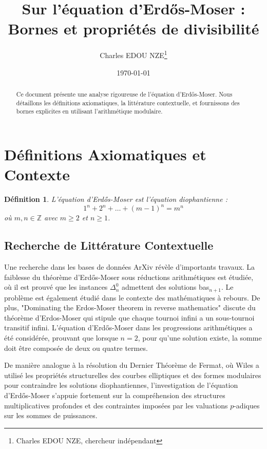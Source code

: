 \documentclass[12pt, a4paper]{article}
\title{Sur l'\'equation d'Erd\H{o}s-Moser : Bornes et propri\'et\'es de divisibilit\'e}
\author{Charles EDOU NZE\thanks{Charles EDOU NZE, chercheur ind\'ependant}}
\date{\today}
\newtheorem{definition}[theorem]{D\'efinition}
\begin{document}
\maketitle

\begin{abstract}
Ce document pr\'esente une analyse rigoureuse de l'\'equation d'Erd\H{o}s-Moser. Nous d\'etaillons les d\'efinitions axiomatiques, la litt\'erature contextuelle, et fournissons des bornes explicites en utilisant l'arithm\'etique modulaire.
\end{abstract}

\tableofcontents
\newpage

\section{D\'efinitions Axiomatiques et Contexte}
\begin{definition}
L'\'equation d'Erd\H{o}s-Moser est l'\'equation diophantienne :
\[ 1^n + 2^n + \dots + (m-1)^n = m^n \]
o\`u $m, n \in \mathbb{Z}$ avec $m \ge 2$ et $n \ge 1$.
\end{definition}

\subsection{Recherche de Litt\'erature Contextuelle}
Une recherche dans les bases de donn\'ees ArXiv r\'ev\`ele d'importants travaux. La faiblesse du th\'eor\`eme d'Erd\H{o}s-Moser sous r\'eductions arithm\'etiques est \'etudi\'ee, o\`u il est prouv\'e que les instances $\Delta^0_n$ admettent des solutions bas$_{n+1}$. Le probl\`eme est \'egalement \'etudi\'e dans le contexte des math\'ematiques \`a rebours. De plus, "Dominating the Erdos-Moser theorem in reverse mathematics" discute du th\'eor\`eme d'Erdos-Moser qui stipule que chaque tournoi infini a un sous-tournoi transitif infini. L'\'equation d'Erd\H{o}s-Moser dans les progressions arithm\'etiques a \'et\'e consid\'er\'ee, prouvant que lorsque $n=2$, pour qu'une solution existe, la somme doit \^etre compos\'ee de deux ou quatre termes.

De mani\`ere analogue \`a la r\'esolution du Dernier Th\'eor\`eme de Fermat, o\`u Wiles a utilis\'e les propri\'et\'es structurelles des courbes elliptiques et des formes modulaires pour contraindre les solutions diophantiennes, l'investigation de l'\'equation d'Erd\H{o}s-Moser s'appuie fortement sur la compr\'ehension des structures multiplicatives profondes et des contraintes impos\'ees par les valuations $p$-adiques sur les sommes de puissances.
\end{document}
